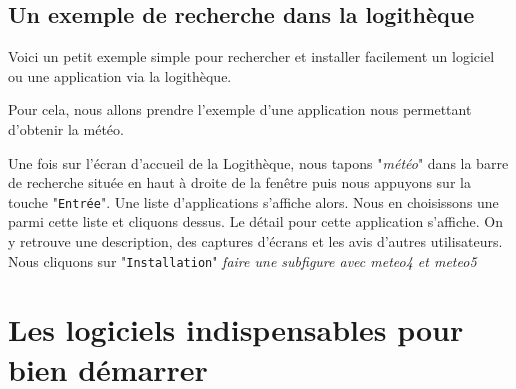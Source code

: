 \documentclass[12pt]{book}
\begin{document}
	\subsection{Un exemple de recherche dans la logithèque}\label{sec:exlogitheque}
		Voici un petit exemple simple pour rechercher et installer facilement un logiciel ou une application via la logithèque.\par
		Pour cela, nous allons prendre l'exemple d'une application nous permettant d'obtenir la météo.\par
		Une fois sur l'écran d'accueil de la Logithèque, nous tapons "\textit{météo}" dans la barre de recherche située en haut à droite de la fenêtre puis nous appuyons sur la touche "\texttt{Entrée}".
		Une liste d'applications s'affiche alors. 
		Nous en choisissons une parmi cette liste et cliquons dessus.
		Le détail pour cette application s'affiche.
		On y retrouve une description, des captures d'écrans et les avis d'autres utilisateurs.
		Nous cliquons sur "\texttt{Installation}"
		\textit{faire une subfigure avec meteo4 et meteo5}
		
\section{Les logiciels indispensables pour bien démarrer}
\end{document}
